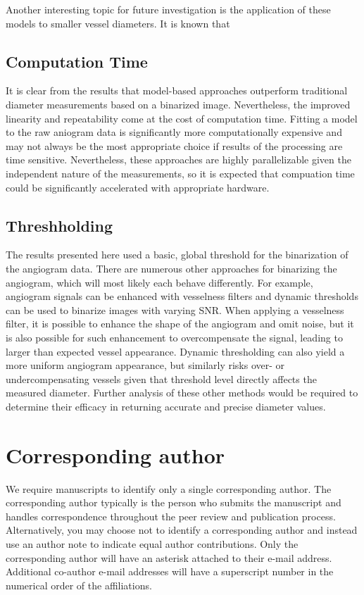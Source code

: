 \documentclass{optica-article}
\begin{document}
Another interesting topic for future investigation is the application of these models to smaller vessel diameters.  It is known that 

\subsection{Computation Time} 
It is clear from the results that model-based approaches outperform traditional diameter measurements based on a binarized image.  Nevertheless, the improved linearity and repeatability come at the cost of computation time.  Fitting a model to the raw aniogram data is significantly more computationally expensive and may not always be the most appropriate choice if results of the processing are time sensitive.  Nevertheless, these approaches are highly parallelizable given the independent nature of the measurements, so it is expected that compuation time could be significantly accelerated with appropriate hardware.

\subsection{Threshholding}
The results presented here used a basic, global threshold for the binarization of the angiogram data.  There are numerous other approaches for binarizing the angiogram, which will most likely each behave differently.  For example, angiogram signals can be enhanced with vesselness filters and dynamic thresholds can be used to binarize images with varying SNR.  When applying a vesselness filter, it is possible to enhance the shape of the angiogram and omit noise, but it is also possible for such enhancement to overcompensate the signal, leading to larger than expected vessel appearance.  Dynamic thresholding can also yield a more uniform angiogram appearance, but similarly risks over- or undercompensating vessels given that threshold level directly affects the measured diameter.  Further analysis of these other methods would be required to determine their efficacy in returning accurate and precise diameter values.  


\section{Corresponding author}

We require manuscripts to identify only a single corresponding author. The corresponding author typically is the person who submits the manuscript and handles correspondence throughout the peer review and publication process. Alternatively, you may choose not to identify a corresponding author and instead use an author note to indicate equal author contributions. Only the corresponding author will have an asterisk attached to their e-mail address. Additional co-author e-mail addresses will have a superscript number in the numerical order of the affiliations. 
\end{document}
